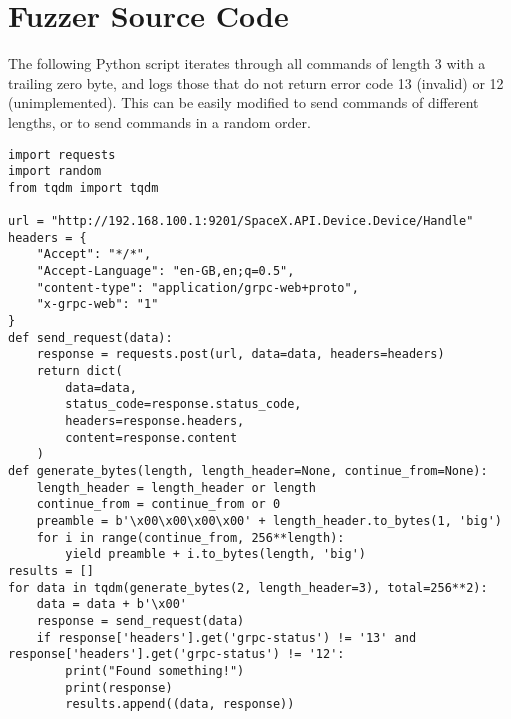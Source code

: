 \section{Fuzzer Source Code}\label{app:fuzzer}

The following Python script iterates through all commands of length 3 with a trailing zero byte, and logs those that do not return error code 13 (invalid) or 12 (unimplemented). This can be easily modified to send commands of different lengths, or to send commands in a random order.

\begin{lstlisting}
import requests
import random
from tqdm import tqdm

url = "http://192.168.100.1:9201/SpaceX.API.Device.Device/Handle"
headers = {
    "Accept": "*/*",
    "Accept-Language": "en-GB,en;q=0.5",
    "content-type": "application/grpc-web+proto",
    "x-grpc-web": "1"
}
def send_request(data):
    response = requests.post(url, data=data, headers=headers)
    return dict(
        data=data,
        status_code=response.status_code,
        headers=response.headers,
        content=response.content
    )
def generate_bytes(length, length_header=None, continue_from=None):
    length_header = length_header or length
    continue_from = continue_from or 0
    preamble = b'\x00\x00\x00\x00' + length_header.to_bytes(1, 'big')
    for i in range(continue_from, 256**length):
        yield preamble + i.to_bytes(length, 'big')
results = []
for data in tqdm(generate_bytes(2, length_header=3), total=256**2):
    data = data + b'\x00'
    response = send_request(data)
    if response['headers'].get('grpc-status') != '13' and response['headers'].get('grpc-status') != '12':
        print("Found something!")
        print(response)
        results.append((data, response))
\end{lstlisting}